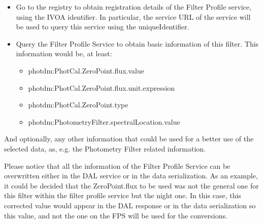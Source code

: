 \documentclass[11pt,a4paper]{ivoa}
\begin{document}
\begin{itemize}
	\item Go to the registry to obtain registration details of the Filter Profile service, using the IVOA identifier. In particular, the service URL of the service will be used to query this service using the uniqueIdentifier.\par

	\item Query the Filter Profile Service to obtain basic information of this filter. This information would be, at least:\par

\begin{itemize}
	\item photdm:PhotCal.ZeroPoint.flux.value\par

	\item photdm:PhotCal.ZeroPoint.flux.unit.expression\par

	\item photdm:PhotCal.ZeroPoint.type\par

	\item photdm:PhotometryFilter.spectralLocation.value
\end{itemize}
\end{itemize}\par

And optionally, any other information that could be used for a better use of the selected data, as, e.g. the Photometry Filter related information.
\par

Please notice that all the information of the Filter Profile Service can be overwritten either in the DAL service or in the data serialization. As an example, it could be decided that the ZeroPoint.flux to be used was not the general one for this filter within the filter profile service but the night one. In this case, this corrected value would appear in the DAL response or in the data serialization so this value, and not the one on the FPS will be used for the conversions.
\par
\end{document}
